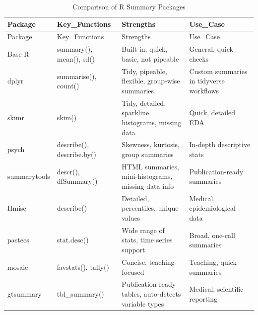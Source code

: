 \documentclass[
  man,
  floatsintext,
  longtable,
  nolmodern,
  notxfonts,
  notimes,
  colorlinks=true,linkcolor=blue,citecolor=blue,urlcolor=blue]{apa7}
\begin{document}
\begin{longtable}[]{@{}
  >{\raggedright\arraybackslash}p{}
  >{\raggedright\arraybackslash}p{}
  >{\raggedright\arraybackslash}p{}
  >{\raggedright\arraybackslash}p{}@{}}
\caption{Comparison of R Summary Packages}\tabularnewline
\toprule\noalign{}
\begin{minipage}[b]{\linewidth}\raggedright
Package
\end{minipage} & \begin{minipage}[b]{\linewidth}\raggedright
Key\_Functions
\end{minipage} & \begin{minipage}[b]{\linewidth}\raggedright
Strengths
\end{minipage} & \begin{minipage}[b]{\linewidth}\raggedright
Use\_Case
\end{minipage} \\
\midrule\noalign{}
\endfirsthead
\toprule\noalign{}
\begin{minipage}[b]{\linewidth}\raggedright
Package
\end{minipage} & \begin{minipage}[b]{\linewidth}\raggedright
Key\_Functions
\end{minipage} & \begin{minipage}[b]{\linewidth}\raggedright
Strengths
\end{minipage} & \begin{minipage}[b]{\linewidth}\raggedright
Use\_Case
\end{minipage} \\
\midrule\noalign{}
\endhead
\bottomrule\noalign{}
\endlastfoot
Base R & summary(), mean(), sd() & Built-in, quick, basic, not pipeable
& General, quick checks \\
dplyr & summarise(), count() & Tidy, pipeable, flexible, group-wise
summaries & Custom summaries in tidyverse workflows \\
skimr & skim() & Tidy, detailed, sparkline histograms, missing data &
Quick, detailed EDA \\
psych & describe(), describe.by() & Skewness, kurtosis, group summaries
& In-depth descriptive stats \\
summarytools & descr(), dfSummary() & HTML summaries, mini-histograms,
missing data info & Publication-ready summaries \\
Hmisc & describe() & Detailed, percentiles, unique values & Medical,
epidemiological data \\
pastecs & stat.desc() & Wide range of stats, time series support &
Broad, one-call summaries \\
mosaic & favstats(), tally() & Concise, teaching-focused & Teaching,
quick summaries \\
gtsummary & tbl\_summary() & Publication-ready tables, auto-detects
variable types & Medical, scientific reporting \\
\end{longtable}
\end{document}
